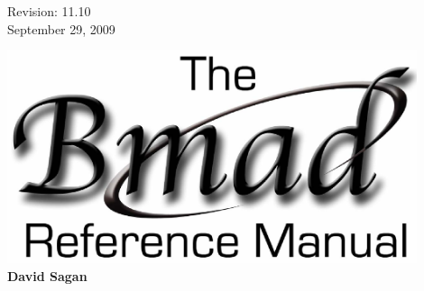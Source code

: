 \thispagestyle{empty}

\begin{flushright}
\large
  Revision: 11.10 \\
  September 29, 2009 \\
\end{flushright}

\vfill

{
\begin{center}
\includegraphics[width=12cm]{bmad-ref-manual.eps} \\
\vskip 0.3in
\huge\bf David Sagan
\end{center}
}

\vfill
\break

